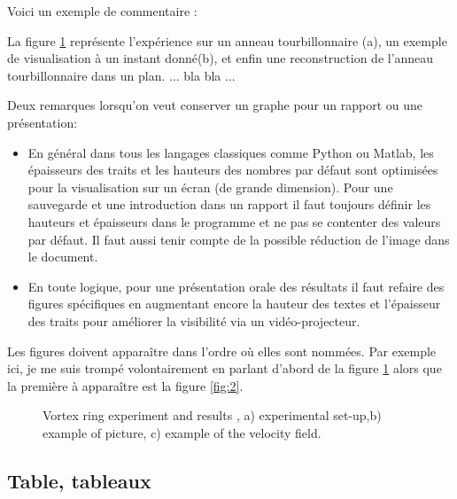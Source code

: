 Voici un exemple de commentaire :

La figure \ref{fig:1} représente l'expérience sur un anneau tourbillonnaire (a), un exemple de visualisation à un instant donné(b), et enfin une reconstruction 
de l'anneau tourbillonnaire dans un plan. ... bla bla ...


Deux remarques lorsqu'on veut conserver un graphe pour un rapport ou une présentation:

\begin{itemize}
\item En général dans tous les langages classiques comme Python ou Matlab, les épaisseurs des traits et les hauteurs des nombres par défaut sont optimisées pour la visualisation sur un écran (de grande dimension). Pour une sauvegarde et
une introduction dans un rapport il faut toujours définir les hauteurs et épaisseurs dans le programme et ne pas se contenter des valeurs par défaut. Il faut aussi tenir compte de la possible réduction de l'image dans le document.

\item En toute logique, pour une présentation orale des résultats il faut
refaire des figures spécifiques en augmentant encore la hauteur des textes et l'épaisseur des traits pour améliorer la visibilité via un vidéo-projecteur.
\end{itemize} 

Les figures doivent apparaître dans l'ordre où elles sont nommées. Par exemple ici, je me suis trompé  volontairement en parlant d'abord de la figure \ref{fig:1}
alors que la première à apparaître est la figure \ref{fig:2}.


 
\begin{figure}[htb]

\caption{Vortex ring experiment and results \cite{Albagnac}, a) experimental set-up,b) example of picture, c) example of the velocity field.}
\label{fig:1}
\end{figure}


 


\subsection{Table, tableaux}


